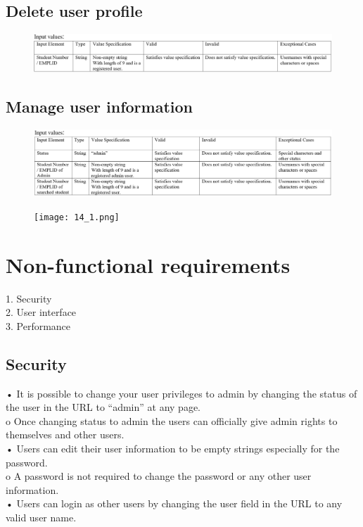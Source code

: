 \documentclass[english]{article}
\begin{document}
\subsection{Delete user profile}
\begin{figure}[ht!]
\hspace*{-2.5cm} 
\includegraphics[width=180mm]{12.png}
\end{figure}

\subsection{Manage user information}
\begin{figure}[ht!]
\hspace*{-2.5cm} 
\includegraphics[width=180mm]{13.png}
\end{figure}

\begin{figure}[ht!]
\hspace*{-2.5cm} 
\texttt{[image: 14\_1.png]}
\end{figure}

\clearpage

\section{Non-functional requirements}
1.	Security\\
2.	User interface\\
3.	Performance\\

\subsection{Security}
•	It is possible to change your user privileges to admin by changing the status of the user in the URL to “admin” at any page.\\
o	Once changing status to admin the users can officially give admin rights to themselves and other users.\\
•	Users can edit their user information to be empty strings especially for the password.\\
o	A password is not required to change the password or any other user information.\\
•	Users can login as other users by changing the user field in the URL to any valid user name.\\
\end{document}
